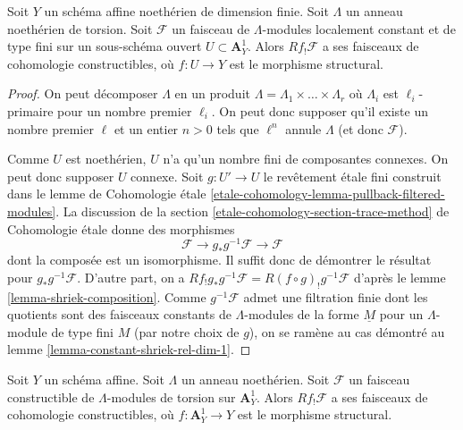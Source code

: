 \begin{lemma}
\label{lemma-loc-constant-shriek-rel-dim-1}
Soit $Y$ un schéma affine noethérien de dimension finie.
Soit $\Lambda$ un anneau noethérien de torsion.
Soit $\mathcal{F}$ un faisceau de
$\Lambda$-modules localement constant et de type fini sur un sous-schéma ouvert $U \subset \mathbf{A}^1_Y$.
Alors $Rf_!\mathcal{F}$ a ses faisceaux de cohomologie constructibles, où
$f : U \to Y$ est le morphisme structural.
\end{lemma}

\begin{proof}
On peut décomposer $\Lambda$ en un produit
$\Lambda = \Lambda_1 \times \ldots \times \Lambda_r$
où $\Lambda_i$ est $\ell_i$-primaire pour un nombre premier $\ell_i$.
On peut donc supposer qu'il existe un nombre premier $\ell$ et un entier $n > 0$
tels que $\ell^n$ annule $\Lambda$ (et donc $\mathcal{F}$).

\medskip\noindent
Comme $U$ est noethérien, $U$ n'a qu'un nombre fini de composantes
connexes. On peut donc supposer $U$ connexe.
Soit $g : U' \to U$ le revêtement étale fini
construit dans le lemme de Cohomologie étale
\ref{etale-cohomology-lemma-pullback-filtered-modules}.
La discussion de la
section \ref{etale-cohomology-section-trace-method} de Cohomologie étale
donne des morphismes
$$
\mathcal{F} \to g_*g^{-1}\mathcal{F} \to \mathcal{F}
$$
dont la composée est un isomorphisme. Il suffit donc de
démontrer le résultat pour $g_*g^{-1}\mathcal{F}$. D'autre part,
on a $Rf_!g_*g^{-1}\mathcal{F} = R(f \circ g)_!g^{-1}\mathcal{F}$
d'après le lemme \ref{lemma-shriek-composition}.
Comme $g^{-1}\mathcal{F}$ admet une filtration finie dont les quotients sont des
faisceaux constants de $\Lambda$-modules de la forme
$\underline{M}$ pour un $\Lambda$-module de type fini $M$
(par notre choix de $g$), on se ramène au cas démontré au
lemme \ref{lemma-constant-shriek-rel-dim-1}.
\end{proof}

\begin{lemma}
\label{lemma-constructible-shriek-rel-dim-1}
Soit $Y$ un schéma affine. Soit $\Lambda$ un anneau noethérien.
Soit $\mathcal{F}$ un faisceau constructible de $\Lambda$-modules de torsion sur
$\mathbf{A}^1_Y$. Alors $Rf_!\mathcal{F}$ a ses faisceaux de cohomologie
constructibles, où $f : \mathbf{A}^1_Y \to Y$ est le morphisme structural.
\end{lemma}

